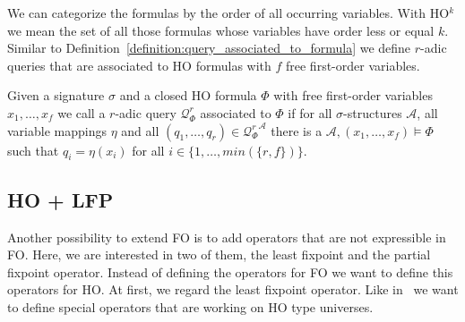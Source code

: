 We can categorize the formulas by the order of all occurring variables. With HO$^k$ we mean 
the set of all those formulas whose variables have order less or equal $k$.
Similar to Definition~\ref{definition:query_associated_to_formula} we define $r$-adic queries that are associated to HO formulas with $f$ free first-order variables. 

\begin{definition}
\label{definition:query_associated_to_formula_ho}
    Given a signature $\sigma$ and a closed HO
    formula $\Phi$ with free first-order variables $x_1, \dots, x_f$ we call a $r$-adic query $\mathcal{Q}^r_\Phi$ associated to $\Phi$ if for all $\sigma$-structures
    $\mathcal{A}$, all variable mappings $\eta$ and all $(q_1, \dots, q_r) \in {\mathcal{Q}^r_\Phi}^\mathcal{A}$ there is a $\mathcal{A}, (x_1, \dots, x_f) \models
     \Phi$ such that $q_i = \eta(x_i)$ for all $i \in
    \{1, \dots, min(\{r, f\})\}$.
\end{definition}

\subsection{HO + LFP}
\label{subsec:hoPlusLfp}

Another possibility to extend FO is to add operators that are not expressible in FO. Here, we are interested in two
of them, the least fixpoint and the partial fixpoint operator. Instead of defining the operators for FO we want
to define this operators for HO. At first, we regard the least fixpoint operator.
Like in~\cite{freireMartins2011descriptive} we want to define special operators that are working on HO type universes.

